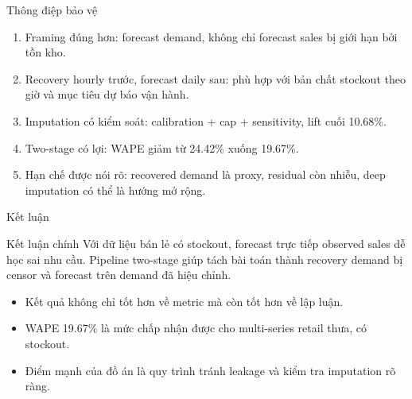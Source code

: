\documentclass[aspectratio=169,10pt]{beamer}
\begin{document}
\begin{frame}{Thông điệp bảo vệ}
    \begin{enumerate}
        \item Framing đúng hơn: forecast demand, không chỉ forecast sales bị giới hạn bởi tồn kho.
        \item Recovery hourly trước, forecast daily sau: phù hợp với bản chất stockout theo giờ và mục tiêu dự báo vận hành.
        \item Imputation có kiểm soát: calibration + cap + sensitivity, lift cuối 10.68\%.
        \item Two-stage có lợi: WAPE giảm từ 24.42\% xuống 19.67\%.
        \item Hạn chế được nói rõ: recovered demand là proxy, residual còn nhiễu, deep imputation có thể là hướng mở rộng.
    \end{enumerate}
\end{frame}

\begin{frame}{Kết luận}
    \begin{block}{Kết luận chính}
    Với dữ liệu bán lẻ có stockout, forecast trực tiếp observed sales dễ học sai nhu cầu. Pipeline two-stage giúp tách bài toán thành recovery demand bị censor và forecast trên demand đã hiệu chỉnh.
    \end{block}
    \vspace{0.2cm}
    \begin{itemize}
        \item Kết quả không chỉ tốt hơn về metric mà còn tốt hơn về lập luận.
        \item WAPE 19.67\% là mức chấp nhận được cho multi-series retail thưa, có stockout.
        \item Điểm mạnh của đồ án là quy trình tránh leakage và kiểm tra imputation rõ ràng.
    \end{itemize}
\end{frame}
\end{document}
